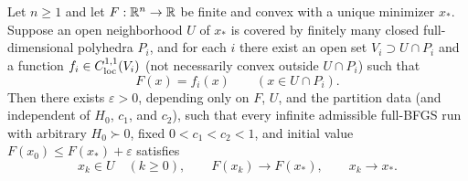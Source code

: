 \begin{theorem}\label{art:polyhedral}
Let $n\ge1$ and let $F:\mathbb R^n\to\mathbb R$ be finite and convex with a unique minimizer
$x_*$. Suppose an open neighborhood $U$ of $x_*$ is covered by finitely many
closed full-dimensional polyhedra $P_i$, and for each $i$ there exist an open
set $V_i\supset U\cap P_i$ and a function $f_i\in C^{1,1}_{\rm loc}(V_i)$
(not necessarily convex outside $U\cap P_i$) such that
\[
 F(x)=f_i(x)\qquad(x\in U\cap P_i).
\]
Then there exists $\varepsilon>0$, depending only on $F$, $U$, and the partition
data (and independent of $H_0$, $c_1$, and $c_2$), such that
every infinite admissible full-BFGS run with arbitrary $H_0\succ0$, fixed
$0<c_1<c_2<1$, and initial value $F(x_0)\le F(x_*)+\varepsilon$ satisfies
\[
 x_k\in U\quad(k\ge0),\qquad F(x_k)\longrightarrow F(x_*),\qquad x_k\longrightarrow x_*.
\]
\end{theorem}
